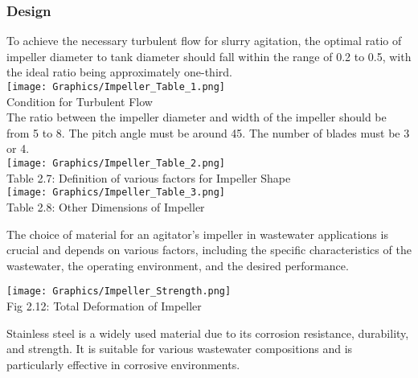 \documentclass[a4,10pt]{report}
\begin{document}
\subsubsection{Design}
\begin{center}
    To achieve the necessary turbulent flow for slurry agitation, the optimal ratio of impeller diameter to tank diameter should fall within the range of 0.2 to 0.5, with the ideal ratio being approximately one-third.\cite{dim_impeller_2} \\
    \texttt{[image: Graphics/Impeller\_Table\_1.png]} \\
    Condition for Turbulent Flow \\
    The ratio between the impeller diameter and width of the impeller should be from 5 to 8. The pitch angle must be around 45\degree. The number of blades must be 3 or 4.\cite{dim_impeller_1} \\ 
    \texttt{[image: Graphics/Impeller\_Table\_2.png]} \\
    \normalsize{Table 2.7: Definition of various factors for Impeller Shape} \\
    \texttt{[image: Graphics/Impeller\_Table\_3.png]} \\
    \normalsize{Table 2.8: Other Dimensions of Impeller} \\
\end{center}

\vspace{0.8cm}
The choice of material for an agitator's impeller in wastewater applications is crucial and depends on various factors, including the specific characteristics of the wastewater, the operating environment, and the desired performance. \\
\begin{center}
    \texttt{[image: Graphics/Impeller\_Strength.png]} \\
    \normalsize{Fig 2.12: Total Deformation of Impeller}
\end{center}
Stainless steel is a widely used material due to its corrosion resistance, durability, and strength. It is suitable for various wastewater compositions and is particularly effective in corrosive environments.
\end{document}
